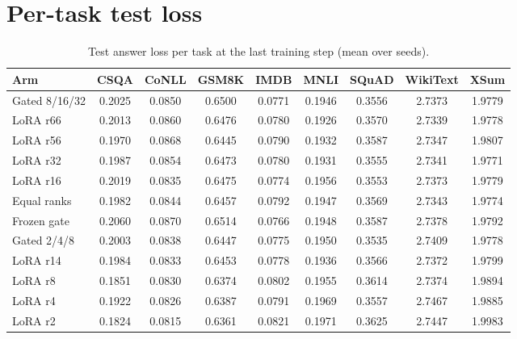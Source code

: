 \documentclass[11pt]{article}
\begin{document}
\section{Per-task test loss}
\label{app:pertask}
\begin{table}[h]
\centering
\small
\caption{Test answer loss per task at the last training step (mean over seeds).}
\begin{tabular}{lcccccccc}
\toprule
Arm & CSQA & CoNLL & GSM8K & IMDB & MNLI & SQuAD & WikiText & XSum \\
\midrule
Gated 8/16/32 & 0.2025 & 0.0850 & 0.6500 & 0.0771 & 0.1946 & 0.3556 & 2.7373 & 1.9779 \\
LoRA r66      & 0.2013 & 0.0860 & 0.6476 & 0.0780 & 0.1926 & 0.3570 & 2.7339 & 1.9778 \\
LoRA r56      & 0.1970 & 0.0868 & 0.6445 & 0.0790 & 0.1932 & 0.3587 & 2.7347 & 1.9807 \\
LoRA r32      & 0.1987 & 0.0854 & 0.6473 & 0.0780 & 0.1931 & 0.3555 & 2.7341 & 1.9771 \\
LoRA r16      & 0.2019 & 0.0835 & 0.6475 & 0.0774 & 0.1956 & 0.3553 & 2.7373 & 1.9779 \\
\midrule
Equal ranks   & 0.1982 & 0.0844 & 0.6457 & 0.0792 & 0.1947 & 0.3569 & 2.7343 & 1.9774 \\
Frozen gate   & 0.2060 & 0.0870 & 0.6514 & 0.0766 & 0.1948 & 0.3587 & 2.7378 & 1.9792 \\
\midrule
Gated 2/4/8   & 0.2003 & 0.0838 & 0.6447 & 0.0775 & 0.1950 & 0.3535 & 2.7409 & 1.9778 \\
LoRA r14      & 0.1984 & 0.0833 & 0.6453 & 0.0778 & 0.1936 & 0.3566 & 2.7372 & 1.9799 \\
LoRA r8       & 0.1851 & 0.0830 & 0.6374 & 0.0802 & 0.1955 & 0.3614 & 2.7374 & 1.9894 \\
LoRA r4       & 0.1922 & 0.0826 & 0.6387 & 0.0791 & 0.1969 & 0.3557 & 2.7467 & 1.9885 \\
LoRA r2       & 0.1824 & 0.0815 & 0.6361 & 0.0821 & 0.1971 & 0.3625 & 2.7447 & 1.9983 \\
\bottomrule
\end{tabular}
\end{table}
\end{document}
